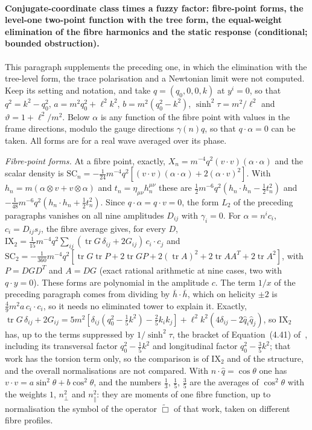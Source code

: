\paragraph{Conjugate-coordinate class times a fuzzy factor: fibre-point forms, the level-one two-point function with the tree form, the equal-weight elimination of the fibre harmonics and the static response (conditional; bounded obstruction).}
This paragraph supplements the preceding one, in which the elimination with the tree-level form, the trace polarisation and a Newtonian limit were not computed. Keep its setting and notation, and take \(q=(q_0,0,0,k)\) at \(y^i=0\), so that \(q^2=k^2-q_0^2\), \(a=m^2q_0^2+\ell^2k^2\), \(b=m^2(q_0^2-k^2)\), \(\sinh^2\tau=m^2/\ell^2\) and \(\vartheta=1+\ell^2/m^2\). Below \(\alpha\) is any function of the fibre point with values in the frame directions, modulo the gauge directions \(\gamma(n)q\), so that \(q\cdot\alpha=0\) can be taken. All forms are for a real wave averaged over its phase.

\emph{Fibre-point forms.} At a fibre point, exactly, \(X_n=m^{-4}q^2(v\cdot v)(\alpha\cdot\alpha)\) and the scalar density is \(\mathrm{SC}_n=-\tfrac1{24}m^{-4}q^2[(v\cdot v)(\alpha\cdot\alpha)+2(\alpha\cdot v)^2]\). With \(h_n=m(\alpha\otimes v+v\otimes\alpha)\) and \(t_n=\eta_{\mu\nu}h_n^{\mu\nu}\) these are \(\tfrac12m^{-6}q^2(h_n\cdot h_n-\tfrac12t_n^2)\) and \(-\tfrac1{48}m^{-6}q^2(h_n\cdot h_n+\tfrac12t_n^2)\). Since \(q\cdot\alpha=q\cdot v=0\), the form \(L_2\) of the preceding paragraphs vanishes on all nine amplitudes \(D_{ij}\) with \(\gamma_i=0\). For \(\alpha=n^ic_i\), \(c_i=D_{ij}s_j\), the fibre average gives, for every \(D\), \(\mathrm{IX}_2=\tfrac1{15}m^{-4}q^2\sum_{ij}(\operatorname{tr}G\,\delta_{ij}+2G_{ij})\,c_i\cdot c_j\) and \(\mathrm{SC}_2=-\tfrac1{360}m^{-4}q^2[\operatorname{tr}G\operatorname{tr}P+2\operatorname{tr}GP+2(\operatorname{tr}A)^2+2\operatorname{tr}AA^{T}+2\operatorname{tr}A^2]\), with \(P=DGD^{T}\) and \(A=DG\) (exact rational arithmetic at nine cases, two with \(q\cdot y=0\)). These forms are polynomial in the amplitude \(c\). The term \(1/x\) of the preceding paragraph comes from dividing by \(\bar h\cdot\bar h\), which on helicity \(\pm2\) is \(\tfrac49m^2a\,c_i\cdot c_i\), so it needs no eliminated tower to explain it. Exactly, \(\operatorname{tr}G\,\delta_{ij}+2G_{ij}=5m^2[\delta_{ij}(q_0^2-\tfrac15k^2)-\tfrac25k_ik_j]+\ell^2k^2(4\delta_{ij}-2\hat q_i\hat q_j)\), so \(\mathrm{IX}_2\) has, up to the terms suppressed by \(1/\sinh^2\tau\), the bracket of Equation~(4.41) of~\cite{Steinacker2026}, including its transversal factor \(q_0^2-\tfrac15k^2\) and longitudinal factor \(q_0^2-\tfrac35k^2\); that work has the torsion term only, so the comparison is of \(\mathrm{IX}_2\) and of the structure, and the overall normalisations are not compared. With \(n\cdot\hat q=\cos\theta\) one has \(v\cdot v=a\sin^2\theta+b\cos^2\theta\), and the numbers \(\tfrac13\), \(\tfrac15\), \(\tfrac35\) are the averages of \(\cos^2\theta\) with the weights \(1\), \(n_\perp^2\) and \(n_\parallel^2\): they are moments of one fibre function, up to normalisation the symbol of the operator \(\tilde\Box\) of that work, taken on different fibre profiles.

